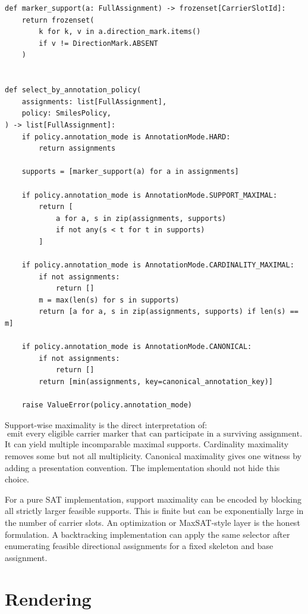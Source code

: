\documentclass[10pt,a4paper]{article}
\theoremstyle{definition}
\theoremstyle{remark}
\begin{document}
\begin{lstlisting}
def marker_support(a: FullAssignment) -> frozenset[CarrierSlotId]:
    return frozenset(
        k for k, v in a.direction_mark.items()
        if v != DirectionMark.ABSENT
    )


def select_by_annotation_policy(
    assignments: list[FullAssignment],
    policy: SmilesPolicy,
) -> list[FullAssignment]:
    if policy.annotation_mode is AnnotationMode.HARD:
        return assignments

    supports = [marker_support(a) for a in assignments]

    if policy.annotation_mode is AnnotationMode.SUPPORT_MAXIMAL:
        return [
            a for a, s in zip(assignments, supports)
            if not any(s < t for t in supports)
        ]

    if policy.annotation_mode is AnnotationMode.CARDINALITY_MAXIMAL:
        if not assignments:
            return []
        m = max(len(s) for s in supports)
        return [a for a, s in zip(assignments, supports) if len(s) == m]

    if policy.annotation_mode is AnnotationMode.CANONICAL:
        if not assignments:
            return []
        return [min(assignments, key=canonical_annotation_key)]

    raise ValueError(policy.annotation_mode)
\end{lstlisting}

Support-wise maximality is the direct interpretation of:
\[
   \text{emit every eligible carrier marker that can participate in a surviving assignment}.
\]
It can yield multiple incomparable maximal supports.  Cardinality maximality
removes some but not all multiplicity.  Canonical maximality gives one witness by
adding a presentation convention.  The implementation should not hide this
choice.

For a pure SAT implementation, support maximality can be encoded by blocking all
strictly larger feasible supports.  This is finite but can be exponentially large
in the number of carrier slots.  An optimization or MaxSAT-style layer is the
honest formulation.  A backtracking implementation can apply the same selector
after enumerating feasible directional assignments for a fixed skeleton and base
assignment.

\section{Rendering}
\label{s:rendering}
\end{document}
